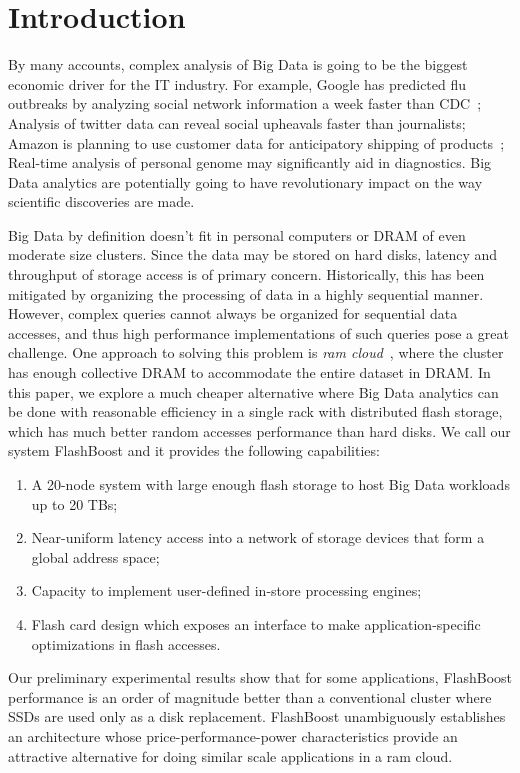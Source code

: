 
\section{Introduction}
\label{sec:intro}
By many accounts, complex analysis of Big Data is going to be the biggest
economic driver for the IT industry. For example, Google has predicted flu
outbreaks by analyzing social network information a week faster than
CDC~\cite{googleflu}; Analysis of twitter data can reveal social upheavals
faster than journalists; Amazon is planning to use customer data for
anticipatory
shipping of products~\cite{amazonanticipatory}; Real-time analysis of personal genome may significantly
aid in diagnostics. Big Data analytics are potentially going to have
revolutionary impact on the way scientific discoveries are made. 

Big Data by definition doesn’t fit in personal computers or DRAM of even
moderate size clusters. Since the data may be stored on hard disks, latency and
throughput of storage access is of primary concern. Historically, this has been
mitigated by organizing the processing of data in a highly sequential manner.
However, complex queries cannot always be organized for sequential data
accesses, and thus high performance implementations of such queries pose a great
challenge. One approach to solving this problem is \emph{ram
cloud}~\cite{ramcloud}, where the cluster has enough collective DRAM to
accommodate the entire dataset in DRAM.  In this paper, we explore a much
cheaper alternative where Big Data analytics can be done with reasonable
efficiency in a single rack with distributed flash storage, which has much
better random accesses performance than hard disks.  We call our system
FlashBoost and it provides the following capabilities:

\begin{enumerate}
\item A 20-node system with large enough flash storage to host Big Data
workloads up to 20 TBs;
\item Near-uniform latency access into a network of storage devices that form a global address space;
\item Capacity to implement user-defined in-store processing engines;
\item Flash card design which exposes an interface to make application-specific optimizations in flash accesses.
\end{enumerate}

Our preliminary experimental results show that for some applications, FlashBoost
performance is an order of magnitude better than a conventional cluster where
SSDs are used only as a disk replacement. FlashBoost unambiguously establishes
an architecture whose price-performance-power characteristics provide an
attractive alternative for doing similar scale applications in a ram cloud.

